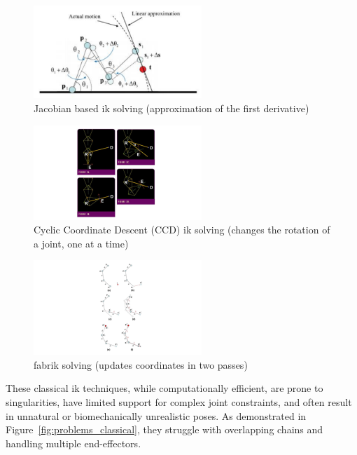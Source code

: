 \documentclass[../../main.tex]{subfiles}
\begin{document}
\begin{figure}
    \centering \includegraphics[width = 2.5in]{chapters/pose_correction/images/jacobian_based.png}
    \caption{Jacobian based \gls{ik} solving (approximation of the first derivative)}
    \label{fig:jacobian_based}
\end{figure}

\begin{figure}
  \centering \includegraphics[width = 2.5in]{chapters/pose_correction/images/ccdik.png}
  \caption{Cyclic Coordinate Descent (CCD) \gls{ik} solving (changes the rotation of a joint, one at a time)}
  \label{fig:ccdik}
\end{figure}

\begin{figure}
  \centering \includegraphics[width = 2.5in]{chapters/pose_correction/images/fabrik.png}
  \caption{\gls{fabrik} solving (updates coordinates in two passes)}
  \label{fig:fabrik}
\end{figure}

These classical \gls{ik} techniques, while computationally efficient, are prone to singularities, have limited support for complex joint constraints, and often result in unnatural or biomechanically unrealistic poses. As demonstrated in Figure~\ref{fig:problems_classical}, they struggle with overlapping chains and handling multiple end-effectors.
\end{document}
